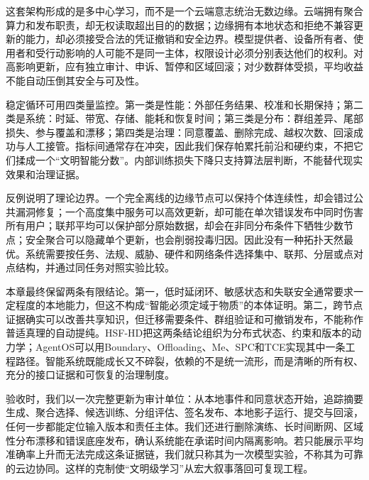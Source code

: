 这套架构形成的是多中心学习，而不是一个云端意志统治无数边缘。云端拥有聚合算力和发布职责，却无权读取超出目的的数据；边缘拥有本地状态和拒绝不兼容更新的能力，却必须接受合法的凭证撤销和安全边界。模型提供者、设备所有者、使用者和受行动影响的人可能不是同一主体，权限设计必须分别表达他们的权利。对高影响更新，应有独立审计、申诉、暂停和区域回滚；对少数群体受损，平均收益不能自动压倒其安全与可及性。

稳定循环可用四类量监控。第一类是性能：外部任务结果、校准和长期保持；第二类是系统：时延、带宽、存储、能耗和恢复时间；第三类是分布：群组差异、尾部损失、参与覆盖和漂移；第四类是治理：同意覆盖、删除完成、越权次数、回滚成功与人工接管。指标间通常存在冲突，因此我们保存帕累托前沿和硬约束，不把它们揉成一个“文明智能分数”。内部训练损失下降只支持算法层判断，不能替代现实效果和治理证据。

反例说明了理论边界。一个完全离线的边缘节点可以保持个体连续性，却会错过公共漏洞修复；一个高度集中服务可以高效更新，却可能在单次错误发布中同时伤害所有用户；联邦平均可以保护部分原始数据，却会在非同分布条件下牺牲少数节点；安全聚合可以隐藏单个更新，也会削弱投毒归因。因此没有一种拓扑天然最优。系统需要按任务、法规、威胁、硬件和网络条件选择集中、联邦、分层或点对点结构，并通过同任务对照实验比较。

本章最终保留两条有限结论。第一，低时延闭环、敏感状态和失联安全通常要求一定程度的本地能力，但这不构成“智能必须定域于物质”的本体证明。第二，跨节点证据确实可以改善共享知识，但迁移需要条件、群组验证和可撤销发布，不能称作普适真理的自动提纯。HSF-HD把这两条结论组织为分布式状态、约束和版本的动力学；AgentOS可以用Boundary、Offloading、Me、SPC和TCE实现其中一条工程路径。智能系统既能成长又不碎裂，依赖的不是统一流形，而是清晰的所有权、充分的接口证据和可恢复的治理制度。

验收时，我们以一次完整更新为审计单位：从本地事件和同意状态开始，追踪摘要生成、聚合选择、候选训练、分组评估、签名发布、本地影子运行、提交与回滚，任何一步都能定位输入版本和责任主体。我们还进行删除演练、长时间断网、区域性分布漂移和错误底座发布，确认系统能在承诺时间内隔离影响。若只能展示平均准确率上升而无法完成这条证据链，我们就只称其为一次模型实验，不称其为可靠的云边协同。这样的克制使“文明级学习”从宏大叙事落回可复现工程。

